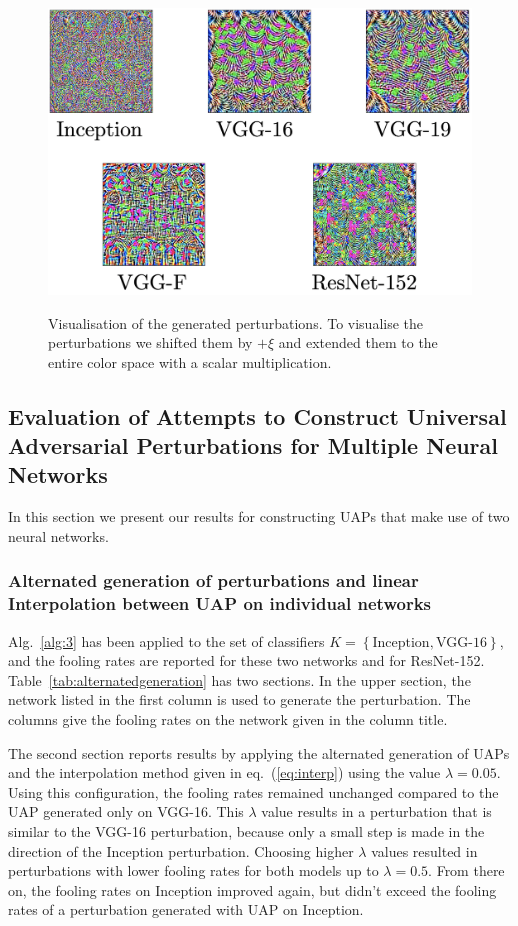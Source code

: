 \documentclass[runningheads]{llncs}
\begin{document}
\begin{figure}[h]\label{fig:UAPs}
	\centering
		\includegraphics[width=1.00\textwidth]{images/own_perturbations.png}
	\label{fig_stoerwerte}
	\caption{Visualisation of the generated perturbations. To visualise the perturbations we shifted them by $+\xi$ and extended them to the entire color space with a scalar multiplication.}
\end{figure}


\subsection{Evaluation of Attempts to Construct Universal Adversarial Perturbations for Multiple Neural Networks}
In this section we present our results for constructing UAPs that make use of two neural networks.
\subsubsection{Alternated generation of perturbations and linear Interpolation between UAP on individual networks}
Alg.~\ref{alg:3} has been applied to the set of classifiers $K=\left\{\text{Inception},\text{VGG-16}\right\}$, and the fooling rates are reported for these two networks and for ResNet-152. Table~\ref{tab:alternatedgeneration} has two sections. In the upper section, the network listed in the first column is used to generate the perturbation. The columns give the fooling rates on the network given in the column title.

The second section reports results by applying the alternated generation of UAPs and the interpolation method given in eq.~(\ref{eq:interp}) using the value $\lambda=0.05$. Using this configuration, the fooling rates remained unchanged compared to the UAP generated only on VGG-16. 
This $\lambda$ value results in a perturbation that is similar to the VGG-16 perturbation, because only a small step is made in the direction of the Inception perturbation. Choosing higher $\lambda$ values resulted in perturbations with lower fooling rates for both models up to $\lambda=0.5$. From there on, the fooling rates on Inception improved again, but didn't exceed the fooling rates of a perturbation generated with UAP on Inception. 
\end{document}
